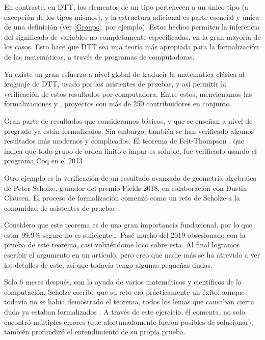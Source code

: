 \documentclass[../main.tex]{subfiles}
\begin{document}
En contraste, en DTT, los elementos de un tipo pertenecen a un \'unico tipo (a excepción de los tipos mismos), y la estructura adicional es parte esencial y \'unica de una definición (ver \ref{Groups}, por ejemplo).
Estos hechos permiten la inferencia del significado de variables no completamente especificadas, en la gran mayor\'ia de los casos.
Esto hace que DTT sea una teor\'ia m\'as apropiada para la formalizaci\'on de las matemáticas, a trav\'es de programas de computadoras.

Ya existe un gran esfuerzo a nivel global de traducir la matemática cl\'asica al lenguaje de DTT, usado por los asistentes de pruebas, y as\'i permitir la verificaci\'on de estos resultados por computadora.
Entre estos, mencionamos las formalizaciones \cite{mahboubi_mathematical_2021} y \cite{the_mathlib_community_lean_2020}, proyectos con m\'as de 250 contribuidores en conjunto.

Gran parte de resultados que consideramos b\'asicos, y que se ense\~nan a nivel de pregrado ya est\'an formalizados.
Sin embargo, tambi\'en se han verificado algunos resultados m\'as modernos y complicados.
El teorema de Feit-Thompson \cite{1103053943}, que indica que todo grupo de orden finito e impar es soluble, fue verificado usando el programa Coq en el 2013 \cite{ftcoq2013}.

Otro ejemplo es la verificaci\'on de un resultado avanzado de geometr\'ia algebraica de Peter Scholze, ganador del premio Fields 2018, en colaboraci\'on con Dustin Clausen.
El proceso de formalizaci\'on comenz\'o como un reto de Scholze a la comunidad de asistentes de pruebas \cite{scholze_2020}:
\begin{displayquote}
    Considero que este teorema es de una gran importancia fundacional, por lo que estar 99.9\% seguro no es suficiente\ldots\
    Pas\'e mucho del 2019 obsesionado con la prueba de este teorema, casi volvi\'endome loco sobre esta. Al final logramos escribir el argumento en un art\'iculo, pero creo que nadie m\'as se ha atrevido a ver los detalles de este, as\'i que todav\'ia tengo algunas peque\~nas dudas.
\end{displayquote}

Solo 6 meses despu\'es, con la ayuda de varios matem\'aticos y cient\'ificos de la computaci\'on, Scholze escribe que su reto era pr\'acticamente un \'exito: aunque todav\'ia no se hab\'ia demostrado el teorema, todos los lemas que causaban cierta duda ya estaban formalizados \cite{scholze_half_2021}.
A trav\'es de este ejercicio, \'el comenta, no solo encontr\'o m\'ultiples errores (que afortunadamente fueron posibles de solucionar), tambi\'en profundiz\'o el entendimiento de su propia prueba.
\end{document}
